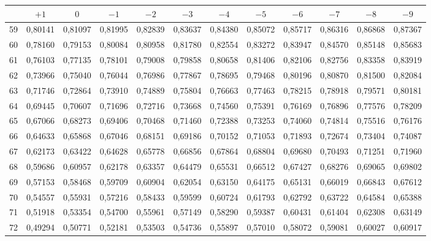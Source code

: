 \documentclass[12pt,a4paper]{article}
\begin{document}
\begin{center}
\footnotesize
\begin{tabular}{|c|c|c|c|c|c|c|c|c|c|c|c|}
\hline
 & $+1$ & $0$ & $-1$ & $-2$ & $-3$ & $-4$ & $-5$ & $-6$ & $-7$ & $-8$ & $-9$ \\
\hline
59 & 0,80141 & 0,81097 & 0,81995 & 0,82839 & 0,83637 & 0,84380 & 0,85072 & 0,85717 & 0,86316 & 0,86868 & 0,87367 \\
60 & 0,78160 & 0,79153 & 0,80084 & 0,80958 & 0,81780 & 0,82554 & 0,83272 & 0,83947 & 0,84570 & 0,85148 & 0,85683 \\
61 & 0,76103 & 0,77135 & 0,78101 & 0,79008 & 0,79858 & 0,80658 & 0,81406 & 0,82106 & 0,82756 & 0,83358 & 0,83919 \\
62 & 0,73966 & 0,75040 & 0,76044 & 0,76986 & 0,77867 & 0,78695 & 0,79468 & 0,80196 & 0,80870 & 0,81500 & 0,82084 \\
63 & 0,71746 & 0,72864 & 0,73910 & 0,74889 & 0,75804 & 0,76663 & 0,77463 & 0,78215 & 0,78918 & 0,79571 & 0,80181 \\
64 & 0,69445 & 0,70607 & 0,71696 & 0,72716 & 0,73668 & 0,74560 & 0,75391 & 0,76169 & 0,76896 & 0,77576 & 0,78209 \\
65 & 0,67066 & 0,68273 & 0,69406 & 0,70468 & 0,71460 & 0,72388 & 0,73253 & 0,74060 & 0,74814 & 0,75516 & 0,76176 \\
66 & 0,64633 & 0,65868 & 0,67046 & 0,68151 & 0,69186 & 0,70152 & 0,71053 & 0,71893 & 0,72674 & 0,73404 & 0,74087 \\
67 & 0,62173 & 0,63422 & 0,64628 & 0,65778 & 0,66856 & 0,67864 & 0,68804 & 0,69680 & 0,70493 & 0,71251 & 0,71960 \\
68 & 0,59686 & 0,60957 & 0,62178 & 0,63357 & 0,64479 & 0,65531 & 0,66512 & 0,67427 & 0,68276 & 0,69065 & 0,69802 \\
69 & 0,57153 & 0,58468 & 0,59709 & 0,60904 & 0,62054 & 0,63150 & 0,64175 & 0,65131 & 0,66019 & 0,66843 & 0,67612 \\
70 & 0,54557 & 0,55931 & 0,57216 & 0,58433 & 0,59599 & 0,60724 & 0,61793 & 0,62792 & 0,63722 & 0,64584 & 0,65388 \\
71 & 0,51918 & 0,53354 & 0,54700 & 0,55961 & 0,57149 & 0,58290 & 0,59387 & 0,60431 & 0,61404 & 0,62308 & 0,63149 \\
72 & 0,49294 & 0,50771 & 0,52181 & 0,53503 & 0,54736 & 0,55897 & 0,57010 & 0,58072 & 0,59081 & 0,60027 & 0,60917 \\
\hline
\end{tabular}
\end{center}
\end{document}
